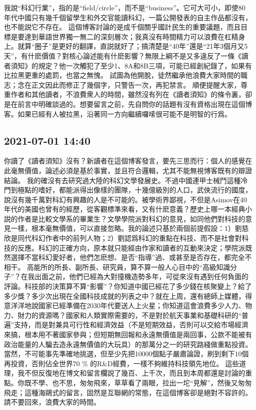 \documentclass[twocolumn]{ctexart}
\begin{document}
我說“科幻行業”，指的是“field/circle”，而不是“business”。它可大可小，即使80年代中國只有幾千個留學生和外交官能讀科幻，一篇公開發表的自主作品都沒有，也不能説它不存在。
這個博客討論的是成千個關乎國計民生的重要議題，而且目標是要達到華語世界獨一無二的深刻層次；我真沒有時間精力可以浪費在杠精身上。就算“圈子”是更好的翻譯，直説就好了；搞清楚是“40年”還是“21年3個月又5天”，有什麽價值？對核心論述能有什麽影響？無限上綱不是又多違反了一條《讀者須知》的規定？他一次觸犯了至少1、8A和8B三項，可能已經創紀錄了，如果有比拉黑更重的處罰，也當之無愧。
試圖為他開脫，徒然繼承他浪費大家時間的職志；念在正文因此而修正了幾個字，只警告一次，再犯禁言。
順便提醒大家，尊重作者和其他讀者，不浪費衆人的時間，雖然沒有列在《讀者須知》的條令裏，卻是在前言中明確談過的。想要留言之前，先自問你的話題有沒有資格出現在這個博客。如果已經有人被拉黑，沿著同一方向繼續囉嗦很可能不是明智的行爲。
\subsection*{2021-07-01 14:40}

你讀了《讀者須知》沒有？新讀者在這個博客發言，要先三思而行：個人的感覺在此毫無價值，論述必須是基於事實，並且符合邏輯，尤其不能無視博客既有的辯證結論。
我的確沒有去研究過大陸的科幻文學發展史。不過中國連甲士械鬥這種冷門到極點的嗜好，都能派得出像樣的團隊，十幾億級別的人口，武俠流行的國度，說沒有幾千萬對科幻有興趣的人是不可能的。被學術界鄙視，不但是Asimov在40年代的美國也曾有的經歷，從客觀標準來看，又有什麽意義？歷史上哪一本經典小説的作者是比較文學系的畢業生？文學學院派對科幻的意見，如同他們對科技的意見一樣，根本毫無價值，可以直接忽略。我的論述只基於兩個前提假設：1）劉慈欣是同代科幻作者中的前列人物；2）劉認爲科幻的重點在科技、而不是社會對科技的反應。科幻的正確方向，原本就只能經由作家和讀者的互動來決定；學院派既然選擇不當科幻愛好者，他們怎麽想、是否“指導”過、或甚至是否存在，都完全不相干。
高能所的所長、副所長、研究員，算不算一般人心目中的“高級知識分子”？在我出面之前，他們已經為大對撞機造勢多年，可從來沒有遇到任何負面的評論。科技部的決策算不算“影響”？你知道中國已經花了多少錢在核聚變上？給了多少獎？多少次出現在全國科技成就的列表之中？就在上周，還有總師上媒體，得意洋洋地說國家已經準備在2030年代要送人上火星；你知道這會浪費多少人力、物力、財力的資源嗎？國家和人類實際需要的，不是對於航天事業和基礎科研的“普遍”支持，而是對兼具可行性和經濟效益（不是短期效益，否則可以交給市場經濟來搞，根本用不著國家參與；但短期無回報和永遠無價值是兩回事，公款不能被有政治能量的人騙去造永遠無價值的大玩具）的那萬分之一的研究路綫做重點投資。當然，不可能事先準確地挑選，但至少先把10000個點子嚴肅論證，刷到剩下10個再投資，否則佔全世界70 \% 的R\&D經費，一樣不夠維持科技領先地位。
這些道理，我不但反復地在博文和留言欄説了幾百、上千次，而且到本周都還是討論的重點。你既不學、也不思，匆匆飛來，草草看了兩眼，拉出一坨“見解”，然後又匆匆飛走；這種海鷗式的留言，固然是互聯網的常態，在這個博客卻是絕對不容許的。請不要回來，浪費大家的時間。
\end{document}
